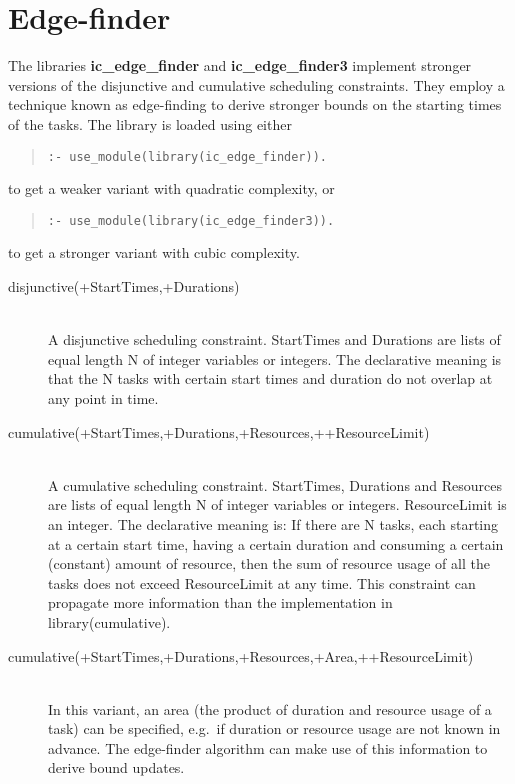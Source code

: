\section{Edge-finder}

The libraries {\bf ic_edge_finder} and {\bf ic_edge_finder3}
implement stronger versions of the
disjunctive and cumulative scheduling constraints. They employ
a technique known as edge-finding to derive stronger bounds on
the starting times of the tasks.
The library is loaded using either
\begin{quote}\begin{verbatim}
:- use_module(library(ic_edge_finder)).
\end{verbatim}\end{quote}
to get a weaker variant with quadratic complexity, or
\begin{quote}\begin{verbatim}
:- use_module(library(ic_edge_finder3)).
\end{verbatim}\end{quote}
to get a stronger variant with cubic complexity.

\begin{description}
\item[disjunctive(+StartTimes,+Durations)]\ \\
A disjunctive scheduling constraint. StartTimes and Durations
are lists of equal length N of integer variables or integers.
The declarative meaning is that the N tasks with certain start times
and duration do not overlap at any point in time.

\item[cumulative(+StartTimes,+Durations,+Resources,++ResourceLimit)]\ \\
A cumulative scheduling constraint. StartTimes, Durations and Resources
are lists of equal length N of integer variables or integers.
ResourceLimit is an integer. The declarative meaning is:
If there are N tasks, each starting at a certain start time, having
a certain duration and consuming a certain (constant) amount of
resource, then the sum of resource usage of all the tasks does not
exceed ResourceLimit at any time.
This constraint can propagate more information than the implementation
in library(cumulative).

\item[cumulative(+StartTimes,+Durations,+Resources,+Area,++ResourceLimit)]\ \\
In this variant, an area (the product of duration and resource usage of
a task) can be specified, e.g.\ if duration or resource usage are not
known in advance. The edge-finder algorithm can make use of this information
to derive bound updates.
\end{description}
